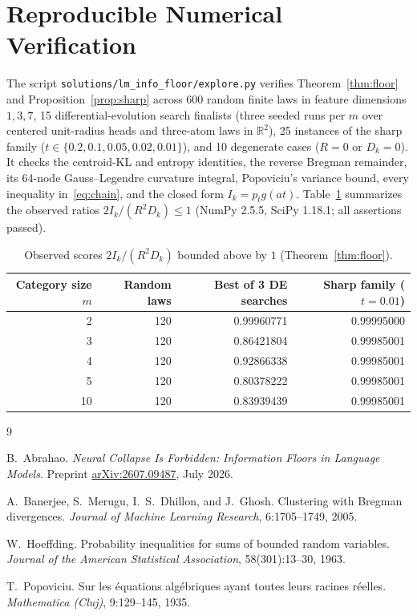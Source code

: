 \documentclass[11pt]{article}
\theoremstyle{plain}
\theoremstyle{definition}
\theoremstyle{remark}
\begin{document}
\section{Reproducible Numerical Verification}

The script \texttt{solutions/lm\_info\_floor/explore.py} verifies Theorem~\ref{thm:floor} and Proposition~\ref{prop:sharp} across 600 random finite laws in feature dimensions $1, 3, 7$, 15 differential-evolution search finalists (three seeded runs per $m$ over centered unit-radius heads and three-atom laws in $\mathbb{R}^2$), 25 instances of the sharp family ($t \in \{0.2, 0.1, 0.05, 0.02, 0.01\}$), and 10 degenerate cases ($R = 0$ or $D_k = 0$). It checks the centroid-KL and entropy identities, the reverse Bregman remainder, its 64-node Gauss--Legendre curvature integral, Popoviciu's variance bound, every inequality in~\eqref{eq:chain}, and the closed form $I_k = p_t g(at)$. Table~\ref{tab:scores} summarizes the observed ratios $2I_k/(R^2 D_k) \le 1$ (NumPy 2.5.5, SciPy 1.18.1; all assertions passed).

\begin{table}[h]
\centering
\begin{tabular}{@{}rrrr@{}}
\toprule
Category size $m$ & Random laws & Best of 3 DE searches & Sharp family ($t = 0.01$) \\
\midrule
2  & 120 & 0.99960771 & 0.99995000 \\
3  & 120 & 0.86421804 & 0.99985001 \\
4  & 120 & 0.92866338 & 0.99985001 \\
5  & 120 & 0.80378222 & 0.99985001 \\
10 & 120 & 0.83939439 & 0.99985001 \\
\bottomrule
\end{tabular}
\caption{Observed scores $2I_k/(R^2 D_k)$ bounded above by $1$ (Theorem~\ref{thm:floor}).}\label{tab:scores}
\end{table}

\begin{thebibliography}{9}

B.~Abrahao.
\emph{Neural Collapse Is Forbidden: Information Floors in Language Models}.
Preprint \href{https://arxiv.org/abs/2607.09487}{arXiv:2607.09487}, July 2026.

A.~Banerjee, S.~Merugu, I.~S.~Dhillon, and J.~Ghosh.
Clustering with Bregman divergences.
\emph{Journal of Machine Learning Research}, 6:1705--1749, 2005.

W.~Hoeffding.
Probability inequalities for sums of bounded random variables.
\emph{Journal of the American Statistical Association}, 58(301):13--30, 1963.

T.~Popoviciu.
Sur les \'equations alg\'ebriques ayant toutes leurs racines r\'eelles.
\emph{Mathematica (Cluj)}, 9:129--145, 1935.

\end{thebibliography}
\end{document}
